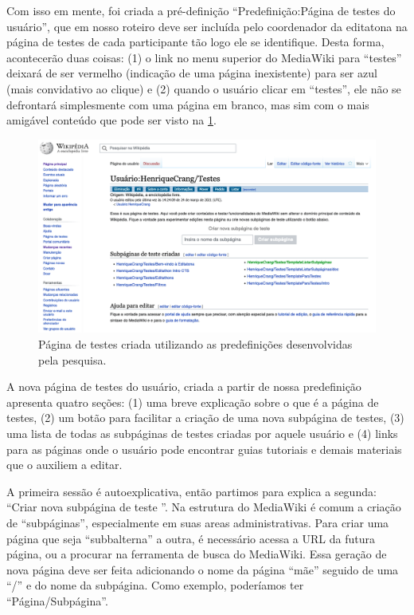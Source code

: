 Com isso em mente, foi criada a pré-definição ``Predefinição:Página de testes do usuário'', que em nosso roteiro deve ser incluída pelo coordenador da editatona na página de testes de cada participante tão logo ele se identifique. Desta forma, acontecerão duas coisas: (1) o link no menu superior do MediaWiki para ``testes'' deixará de ser vermelho (indicação de uma página inexistente) para ser azul (mais convidativo ao clique) e (2) quando o usuário clicar em ``testes'', ele não se defrontará simplesmente com uma página em branco, mas sim com o mais amigável conteúdo que pode ser visto na \ref{fig:pagina_de_testes_editatona}.

\begin{figure}[H]
    \centering
    \includegraphics[width=1\textwidth]{Images/pagina_de_Testes.png}
    \caption{Página de testes criada utilizando as predefinições desenvolvidas pela pesquisa.}
    \label{fig:pagina_de_testes_editatona}
\end{figure}

A nova página de testes do usuário, criada a partir de nossa predefinição apresenta quatro seções: (1) uma breve explicação sobre o que é a página de testes, (2) um botão para facilitar a criação de uma nova subpágina de testes, (3) uma lista de todas as subpáginas de testes criadas por aquele usuário e (4) links para as páginas onde o usuário pode encontrar guias tutoriais e demais materiais que o auxiliem a editar.

A primeira sessão é autoexplicativa, então partimos para explica a segunda: ``Criar nova subpágina de teste ''. Na estrutura do MediaWiki é comum a criação de ``subpáginas'', especialmente em suas areas administrativas. Para criar uma página que seja ``subbalterna'' a outra, é necessário acessa a URL da futura página, ou a procurar na ferramenta de busca do MediaWiki. Essa geração de nova página deve ser feita adicionando o nome da página ``mãe'' seguido de uma ``/'' e do nome da subpágina. Como exemplo, poderíamos ter ``Página/Subpágina''.

